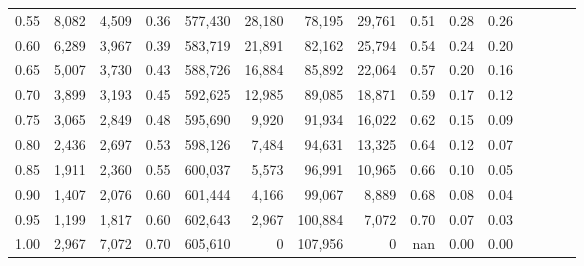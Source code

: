 \begin{tabular}{rrrcrrrrrrrrrrr}
0.55 &    8,082 &  4,509 &                                       0.36 &  577,430 &   28,180 &   78,195 &   29,761 &  0.51 &  0.28 &                         0.26 \\
0.60 &    6,289 &  3,967 &                                       0.39 &  583,719 &   21,891 &   82,162 &   25,794 &  0.54 &  0.24 &                         0.20 \\
0.65 &    5,007 &  3,730 &                                       0.43 &  588,726 &   16,884 &   85,892 &   22,064 &  0.57 &  0.20 &                         0.16 \\
0.70 &    3,899 &  3,193 &                                       0.45 &  592,625 &   12,985 &   89,085 &   18,871 &  0.59 &  0.17 &                         0.12 \\
0.75 &    3,065 &  2,849 &                                       0.48 &  595,690 &    9,920 &   91,934 &   16,022 &  0.62 &  0.15 &                         0.09 \\
0.80 &    2,436 &  2,697 &                                       0.53 &  598,126 &    7,484 &   94,631 &   13,325 &  0.64 &  0.12 &                         0.07 \\
0.85 &    1,911 &  2,360 &                                       0.55 &  600,037 &    5,573 &   96,991 &   10,965 &  0.66 &  0.10 &                         0.05 \\
0.90 &    1,407 &  2,076 &                                       0.60 &  601,444 &    4,166 &   99,067 &    8,889 &  0.68 &  0.08 &                         0.04 \\
0.95 &    1,199 &  1,817 &                                       0.60 &  602,643 &    2,967 &  100,884 &    7,072 &  0.70 &  0.07 &                         0.03 \\
1.00 &    2,967 &  7,072 &                                       0.70 &  605,610 &        0 &  107,956 &        0 &   nan &  0.00 &                         0.00 \\
\bottomrule
\end{tabular}
